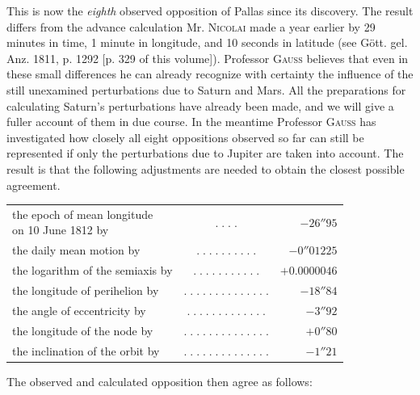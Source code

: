 \par\indent This is now the \emph{eighth} observed opposition of Pallas since its discovery. The result differs from the advance calculation Mr. \textsc{Nicolai} made a year earlier by 29 minutes in time, 1 minute in longitude, and 10 seconds in latitude (see Gött. gel. Anz. 1811, p. 1292 [p. 329 of this volume]). Professor \textsc{Gauss} believes that even in these small differences he can already recognize with certainty the influence of the still unexamined perturbations due to Saturn and Mars. All the preparations for calculating Saturn’s perturbations have already been made, and we will give a fuller account of them in due course. In the meantime Professor \textsc{Gauss} has investigated how closely all eight oppositions observed so far can still be represented if only the perturbations due to Jupiter are taken into account. The result is that the following adjustments are needed to obtain the closest possible agreement.

\begin{center}\fontsize{9}{11}\selectfont\setlength{\tabcolsep}{2pt}\renewcommand{\arraystretch}{1.15}\begin{tabular}{lcr}
\shortstack[l]{the epoch of mean longitude\\on 10 June 1812 by} & $.\;.\;.\;.$ & $-26''95$\\
the daily mean motion by & $.\;.\;.\;.\;.\;.\;.\;.\;.\;.$ & $-0''01225$\\
the logarithm of the semiaxis by & $.\;.\;.\;.\;.\;.\;.\;.\;.\;.\;.$ & $+0.0000046$\\
the longitude of perihelion by & $.\;.\;.\;.\;.\;.\;.\;.\;.\;.\;.\;.\;.\;.$ & $-18''84$\\
the angle of eccentricity by & $.\;.\;.\;.\;.\;.\;.\;.\;.\;.\;.\;.\;.$ & $-3''92$\\
the longitude of the node by & $.\;.\;.\;.\;.\;.\;.\;.\;.\;.\;.\;.\;.\;.$ & $+0''80$\\
the inclination of the orbit by & $.\;.\;.\;.\;.\;.\;.\;.\;.\;.\;.\;.\;.\;.$ & $-1''21$\\
\end{tabular}\end{center}

\noindent The observed and calculated opposition then agree as follows:

